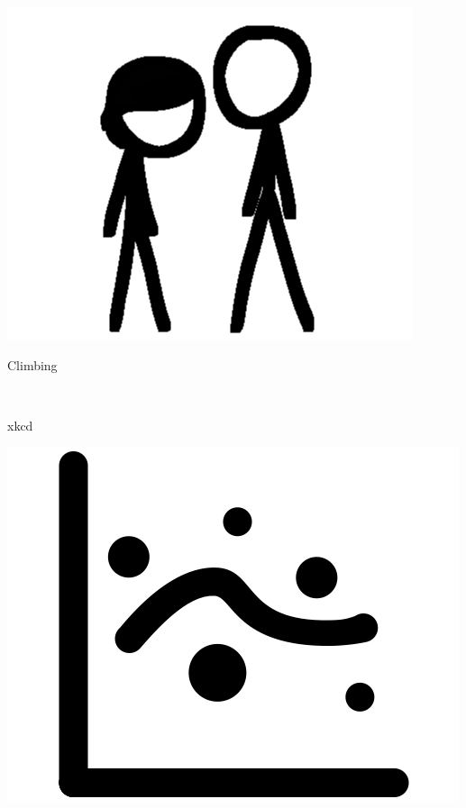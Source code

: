\documentclass[12pt]{resume}
\begin{document}
\begin{minipage}[t]{0.48\textwidth}
\begin{spacing}{1.05}
\begin{minipage}[t]{0.1\textwidth}
        {\par \includegraphics[scale=.15]{xkcd}}
    \end{minipage}
    \begin{minipage}[t]{0.38\textwidth}
        {\par \large Climbing}\\
        {\par \large xkcd}
    \end{minipage}
    \begin{minipage}[t]{0.1\textwidth}
        {\par \includegraphics[scale=.038]{math}}\\

\end{minipage}
\end{spacing}
\end{minipage}
\end{document}
